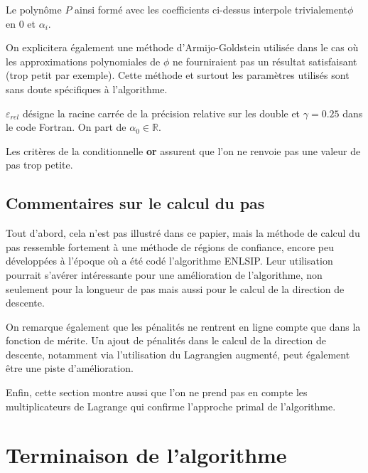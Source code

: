 \documentclass[a4paper,11pt]{article}
\newcommand{\real}{\mathbb{R}}
\numberwithin{equation}{section}
\begin{document}
Le polynôme $P$ ainsi formé avec les coefficients ci-dessus interpole trivialement$\phi$ en $0$ et $\alpha_i$.


On explicitera également une méthode d'Armijo-Goldstein utilisée dans le cas où les approximations polynomiales de $\phi$ ne fourniraient pas un résultat satisfaisant (trop petit par exemple). Cette méthode et surtout les paramètres utilisés sont sans doute spécifiques à l'algorithme. 

$\varepsilon_{rel}$ désigne la racine carrée de la précision relative sur les double et $\gamma = 0.25$ dans le code Fortran.
On part de $\alpha_{0} \in \real$.
\begin{algorithmic}
\ENDWHILE
\RETURN{$\alpha$}
\end{algorithmic}

Les critères de la conditionnelle \textbf{or} assurent que l'on ne renvoie pas une valeur de pas trop petite.

\subsection{Commentaires sur le calcul du pas}

Tout d'abord, cela n'est pas illustré dans ce papier, mais la méthode de calcul du pas ressemble fortement à une méthode de régions de confiance, encore peu développées à l'époque où a été codé l'algorithme ENLSIP. Leur utilisation pourrait s'avérer intéressante pour une amélioration de l'algorithme, non seulement pour la longueur de pas mais aussi pour le calcul de la direction de descente.  

On remarque également que les pénalités ne rentrent en ligne compte que dans la fonction de mérite. Un ajout de pénalités dans le calcul de la direction de descente, notamment via l'utilisation du Lagrangien augmenté, peut également être une piste d'amélioration.

Enfin, cette section montre aussi que l'on ne prend pas en compte les multiplicateurs de Lagrange qui confirme l'approche primal de l'algorithme.

\section{Terminaison de l'algorithme}
\end{document}
